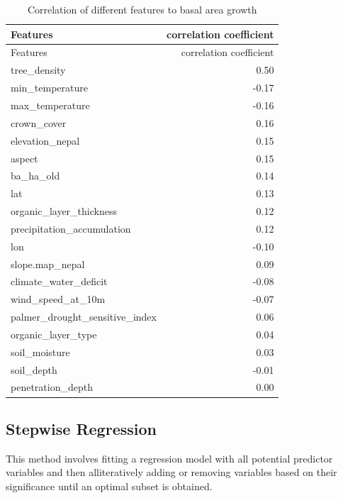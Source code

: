 \documentclass[
]{article}
\begin{document}
\begin{longtable}[]{@{}lr@{}}
\caption{Correlation of different features to basal area
growth}\tabularnewline
\toprule\noalign{}
Features & correlation coefficient \\
\midrule\noalign{}
\endfirsthead
\toprule\noalign{}
Features & correlation coefficient \\
\midrule\noalign{}
\endhead
\bottomrule\noalign{}
\endlastfoot
tree\_density & 0.50 \\
min\_temperature & -0.17 \\
max\_temperature & -0.16 \\
crown\_cover & 0.16 \\
elevation\_nepal & 0.15 \\
aspect & 0.15 \\
ba\_ha\_old & 0.14 \\
lat & 0.13 \\
organic\_layer\_thickness & 0.12 \\
precipitation\_accumulation & 0.12 \\
lon & -0.10 \\
slope.map\_nepal & 0.09 \\
climate\_water\_deficit & -0.08 \\
wind\_speed\_at\_10m & -0.07 \\
palmer\_drought\_sensitive\_index & 0.06 \\
organic\_layer\_type & 0.04 \\
soil\_moisture & 0.03 \\
soil\_depth & -0.01 \\
penetration\_depth & 0.00 \\
\end{longtable}

\hypertarget{stepwise-regression}{%
\subsection{Stepwise Regression}\label{stepwise-regression}}

This method involves fitting a regression model with all potential
predictor variables and then alliteratively adding or removing variables
based on their significance until an optimal subset is obtained.
\end{document}
